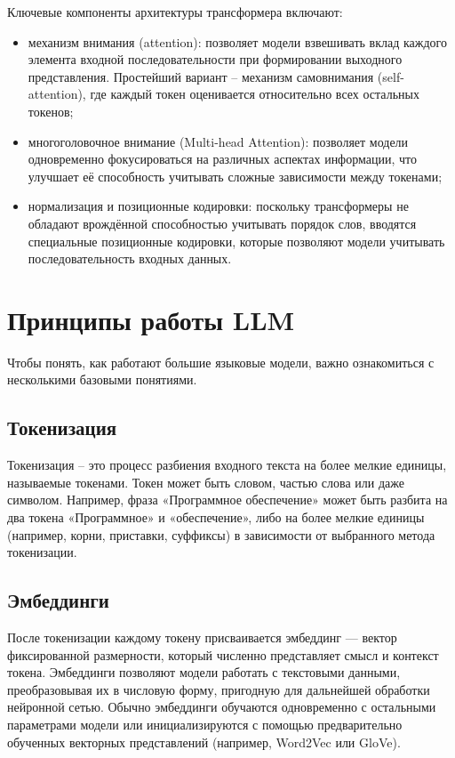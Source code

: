 Ключевые компоненты архитектуры трансформера включают:
\begin{itemize}
    \item 
    механизм внимания (attention): 
    позволяет модели взвешивать вклад каждого элемента входной последовательности при формировании выходного представления. 
    Простейший вариант -- механизм самовнимания (self-attention), где каждый токен оценивается относительно всех остальных токенов;
    \item
    многоголовочное внимание (Multi-head Attention): 
    позволяет модели одновременно фокусироваться на различных аспектах информации, что улучшает её способность учитывать сложные зависимости между токенами;
    \item
    нормализация и позиционные кодировки: 
    поскольку трансформеры не обладают врождённой способностью учитывать порядок слов, вводятся специальные позиционные кодировки, 
    которые позволяют модели учитывать последовательность входных данных.

\end{itemize}
    
\section{Принципы работы LLM}

Чтобы понять, как работают большие языковые модели, важно ознакомиться с несколькими базовыми понятиями.

\subsection{Токенизация} 

Токенизация – это процесс разбиения входного текста на более мелкие единицы, называемые токенами. 
Токен может быть словом, частью слова или даже символом. 
Например, фраза «Программное обеспечение» может быть разбита на два токена «Программное» и «обеспечение», 
либо на более мелкие единицы (например, корни, приставки, суффиксы) в зависимости от выбранного метода токенизации.

\subsection{Эмбеддинги}

После токенизации каждому токену присваивается эмбеддинг — вектор фиксированной размерности, который численно представляет смысл и контекст токена. 
Эмбеддинги позволяют модели работать с текстовыми данными, преобразовывая их в числовую форму, пригодную для дальнейшей обработки нейронной сетью. 
Обычно эмбеддинги обучаются одновременно с остальными параметрами модели или инициализируются с помощью предварительно обученных векторных представлений (например, Word2Vec или GloVe).

